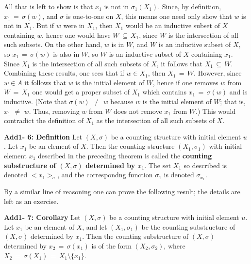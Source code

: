         All that is left to show is that $x_{1}$ is not in ${\sigma}_{1}(X_{1})$.
    Since, by definition, $x_{1} \,=\, {\sigma}(w)$, and ${\sigma}$ is one-to-one on $X$, this means one need only show that $w$ is not in $X_{1}$.
    But if $w$ were in $X_{1}$, then $X_{1}$ would be an inductive subset of $X$ containing $w$,
    hence one would have $W \,{\subseteq}\, X_{1}$, since $W$ is the intersection of all such subsets.
    On the other hand, $w$ is in $W$, and $W$ is an inductive subset of $X$, so $x_{1} \,=\, {\sigma}(w)$ is also in $W$, so $W$ is an inductive subset of $X$ containing $x_{1}$.
    Since $X_{1}$ is the intersection of all such subsets of $X$, it follows that $X_{1} \,{\subseteq}\, W$.
    Combining these results, one sees that if $w{\in}X_{1}$, then $X_{1} \,=\, W$.
    However, since $w{\in}A$ it follows that $w$ is the initial element of $W$, hence if one removes $w$ from $W \,=\, X_{1}$ one would get a proper subset of $X_{1}$ which contains $x_{1} \,=\, {\sigma}(w)$ and is inductive.
    (Note that ${\sigma}(w) \,\,{\neq}\,\, w$ because $w$ is the initial element of $W$; that is, $x_{1} \,\,{\neq}\,\, w$. Thus, removing $w$ from $W$ does not remove $x_{1}$ from $W$.)
    This would contradict the definition of $X_{1}$ as the intersection of all such subsets of $X$.

\V

        {\bf Add1- 6: Definition} Let $(X,{\sigma})$ be a counting structure with initial element $u$.
    Let $x_{1}$ be an element of $X$. Then the counting structure $(X_{1},{\sigma}_{1})$ with initial element $x_{1}$
    described in the preceding theorem is called the {\bf counting substructure of $(X,{\sigma})$ determined by $x_{1}$}.
    The set $X_{1}$ so described is denoted $<x_{1}>_{{\sigma}}$, and the correspondng function ${\sigma}_{1}$ is denoted ${\sigma}_{x_{1}}$.

\V
\V

        By a similar line of reasoning one can prove the following result; the details are left as an exercise.

\V

        {\bf Add1- 7: Corollary} Let $(X,{\sigma})$ be a counting structure with initial element $u$.
    Let $x_{1}$ be an element of $X$, and let $(X_{1},{\sigma}_{1})$ be the counting substructure of $(X,{\sigma})$ determined by $x_{1}$.
    Then the counting substructure of $(X,{\sigma})$ determined by $x_{2} \,=\, {\sigma}(x_{1})$ is of the form $(X_{2},{\sigma}_{2})$,
    where $X_{2} \,=\, {\sigma}(X_{1}) \,=\, X_{1}{\setminus}\{x_{1}\}$.

